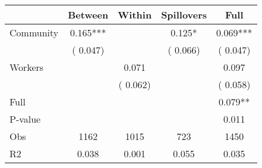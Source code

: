 
\begin{tabular}{l*{4}{c}}\hline&\multicolumn{1}{c}{Between}&\multicolumn{1}{c}{Within}&\multicolumn{1}{c}{Spillovers}&\multicolumn{1}{c}{Full}\\ \hline
 Community             &              0.165***      &                                               &        0.125* &         0.069***                            \\ 
                               &        (       0.047)           &                                       &       (       0.066)     &      (       0.047)                                           \\ 
 Workers       &                                               &        0.071    &                                &             0.097                            \\ 
                               &                                               & (       0.062)                  &                                        &      (       0.058)                                           \\ 
\hline                                                                                                                                                                                                                                            
 Full                  &                                               &                                               &                                        &             0.079**                                     \\ 
 P-value               &                                               &                                               &                                        &             0.011                                           \\ 
 Obs                   &               1162               &       1015                       &       723                &              1450                                               \\ 
 R2                    &                      0.038              &              0.001                      &              0.055               &                     0.035                                              \\ 
\hline \end{tabular}                                                                                                                                                                                                              